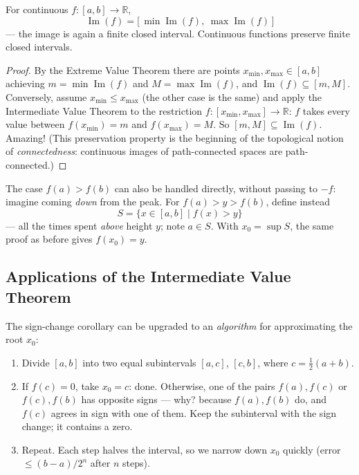 \documentclass[11pt]{report}
\begin{document}
\begin{corbox}
For continuous $f: [a,b] \to \mathbb{R}$,
\[
\operatorname{Im}(f) = \bigl[\, \min \operatorname{Im}(f),\ \max \operatorname{Im}(f) \,\bigr]
\]
--- the image is again a finite closed interval. Continuous functions preserve finite closed intervals.
\end{corbox}

\begin{proof}
By the Extreme Value Theorem there are points $x_{\min}, x_{\max} \in [a,b]$ achieving $m = \min\operatorname{Im}(f)$ and $M = \max\operatorname{Im}(f)$, and $\operatorname{Im}(f) \subseteq [m, M]$. Conversely, assume $x_{\min} \leq x_{\max}$ (the other case is the same) and apply the Intermediate Value Theorem to the restriction $f: [x_{\min}, x_{\max}] \to \mathbb{R}$: $f$ takes every value between $f(x_{\min}) = m$ and $f(x_{\max}) = M$. So $[m,M] \subseteq \operatorname{Im}(f)$. Amazing! (This preservation property is the beginning of the topological notion of \emph{connectedness}: continuous images of path-connected spaces are path-connected.)
\end{proof}

\begin{rembox}
The case $f(a) > f(b)$ can also be handled directly, without passing to $-f$: imagine coming \emph{down} from the peak. For $f(a) > y > f(b)$, define instead
\[
S = \{ x \in [a,b] \mid f(x) > y \}
\]
--- all the times spent \emph{above} height $y$; note $a \in S$. With $x_0 = \sup S$, the same proof as before gives $f(x_0) = y$.
\end{rembox}

\subsection{Applications of the Intermediate Value Theorem}

\begin{rembox}
The sign-change corollary can be upgraded to an \emph{algorithm} for approximating the root $x_0$:
\begin{enumerate}[label=(\arabic*)]
    \item Divide $[a,b]$ into two equal subintervals $[a,c]$, $[c,b]$, where $c = \tfrac12(a+b)$.
    \item If $f(c) = 0$, take $x_0 = c$: done. Otherwise, one of the pairs $f(a), f(c)$ or $f(c), f(b)$ has opposite signs --- why? because $f(a), f(b)$ do, and $f(c)$ agrees in sign with one of them. Keep the subinterval with the sign change; it contains a zero.
    \item Repeat. Each step halves the interval, so we narrow down $x_0$ quickly (error $\leq (b-a)/2^n$ after $n$ steps).
\end{enumerate}
\end{rembox}
\end{document}
